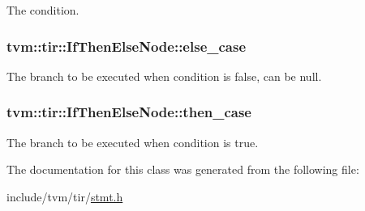 The condition. 

\subsubsection[{\texorpdfstring{else\+\_\+case}{else_case}}]{ tvm\+::tir\+::\+If\+Then\+Else\+Node\+::else\+\_\+case}\hypertarget{classtvm_1_1tir_1_1IfThenElseNode_a301cd38fe44e590852d34849df59ce21}{}\label{classtvm_1_1tir_1_1IfThenElseNode_a301cd38fe44e590852d34849df59ce21}


The branch to be executed when condition is false, can be null. 

\subsubsection[{\texorpdfstring{then\+\_\+case}{then_case}}]{ tvm\+::tir\+::\+If\+Then\+Else\+Node\+::then\+\_\+case}\hypertarget{classtvm_1_1tir_1_1IfThenElseNode_ae7245cad13c62b608897f8c7ba70b6f6}{}\label{classtvm_1_1tir_1_1IfThenElseNode_ae7245cad13c62b608897f8c7ba70b6f6}


The branch to be executed when condition is true. 



The documentation for this class was generated from the following file\+:\begin{DoxyCompactItemize}
\item 
include/tvm/tir/\hyperlink{stmt_8h}{stmt.\+h}\end{DoxyCompactItemize}
